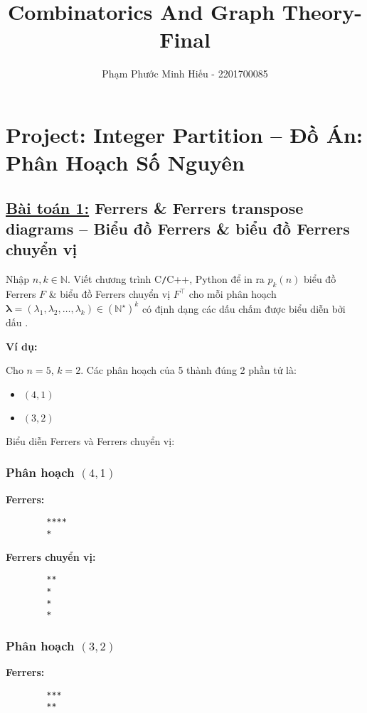\documentclass{article}
\title{Combinatorics And Graph Theory-Final}
\author{Phạm Phước Minh Hiếu - 2201700085}
\begin{document}
	\maketitle
	\section*{Project: Integer Partition -- Đồ Án: Phân Hoạch Số Nguyên}
	
	\subsection*{\underline{Bài toán 1:} Ferrers \& Ferrers transpose diagrams -- Biểu đồ Ferrers \& biểu đồ Ferrers chuyển vị}
	
	Nhập $n,k\in\mathbb{N}$. Viết chương trình {\sf C{\tt/}C++, Python} để in ra $p_k(n)$ biểu đồ Ferrers $F$ \& biểu đồ Ferrers chuyển vị $F^\top$ cho mỗi phân hoạch $\boldsymbol{\lambda} = (\lambda_1,\lambda_2,\ldots,\lambda_k)\in(\mathbb{N}^\star)^k$ có định dạng các dấu chấm được biểu diễn bởi dấu {\tt*}.
	
	\textbf{Ví dụ:}
	
	Cho $n = 5$, $k = 2$. Các phân hoạch của 5 thành đúng 2 phần tử là:
	
	\begin{itemize}
		\item $(4,1)$
		\item $(3,2)$
	\end{itemize}
	
	Biểu diễn Ferrers và Ferrers chuyển vị:
	
	\subsubsection*{Phân hoạch $(4,1)$}
	
	\textbf{Ferrers:}
	\begin{Verbatim}
		****
		*
	\end{Verbatim}
	
	\textbf{Ferrers chuyển vị:}
	\begin{Verbatim}
		**
		*
		*
		*
	\end{Verbatim}
	
	\subsubsection*{Phân hoạch $(3,2)$}
	
	\textbf{Ferrers:}
	\begin{Verbatim}
		***
		**
	\end{Verbatim}
	
\end{document}

